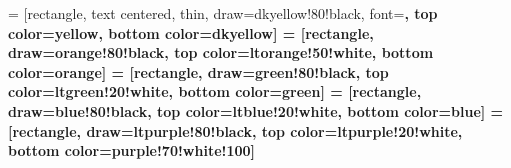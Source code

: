 

 = [rectangle, 
                    text centered,
                    thin,
                    draw=dkyellow!80!black,
                    font=\bfseries,
                    top color=yellow,
                    bottom color=dkyellow]
 = [rectangle, 
                    draw=orange!80!black,
                    top color=ltorange!50!white,
                    bottom color=orange]
 = [rectangle, 
                    draw=green!80!black,
                    top color=ltgreen!20!white,
                    bottom color=green]
 = [rectangle, 
                    draw=blue!80!black,
                    top color=ltblue!20!white,
                    bottom color=blue]
 = [rectangle, 
                      draw=ltpurple!80!black,
                      top color=ltpurple!20!white,
                      bottom color=purple!70!white!100]

